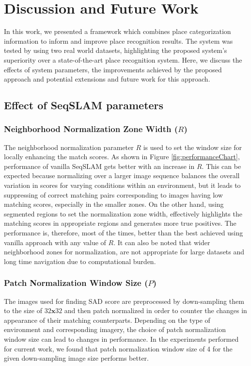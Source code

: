 \documentclass[letterpaper, 10 pt, conference]{ieeeconf}  %
\begin{document}
\section{Discussion and Future Work}
In this work, we presented a framework which combines place categorization information to inform and improve place recognition results. The system was tested by using two real world datasets, highlighting the proposed system's superiority over a state-of-the-art place recognition system. Here, we discuss the effects of system parameters, the improvements achieved by the proposed approach and potential extensions and future work for this approach. 

\subsection{Effect of SeqSLAM parameters}
\subsubsection{Neighborhood Normalization Zone Width ($R$)}
The neighborhood normalization parameter $R$ is used to set the window size for locally enhancing the match scores. As shown in Figure \ref{fig:performanceChart}, performance of vanilla SeqSLAM gets better with an increase in $R$. This can be expected because normalizing over a larger image sequence balances the overall variation in scores for varying conditions within an environment, but it leads to suppressing of correct matching pairs corresponding to images having low matching scores, especially in the smaller zones. On the other hand, using segmented regions to set the normalization zone width, effectively highlights the matching scores in appropriate regions and generates more true positives. The performance is, therefore, most of the times, better than the best achieved using vanilla approach with any value of $R$. It can also be noted that wider neighborhood zones for normalization, are not appropriate for large datasets and long time navigation due to computational burden. 

\subsubsection{Patch Normalization Window Size ($P$)}
The images used for finding SAD score are preprocessed by down-sampling them to the size of $32\mathbf{x}32$ and then patch normalized in order to counter the changes in appearance of their matching counterparts. Depending on the type of environment and corresponding imagery, the choice of patch normalization window size can lead to changes in performance. In the experiments performed for current work, we found that patch normalization window size of 4 for the given down-sampling image size performs better.
\end{document}

